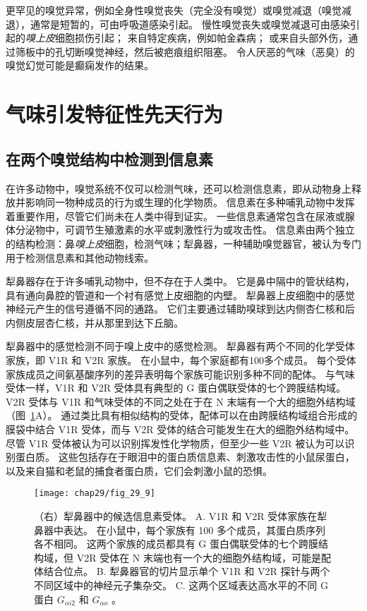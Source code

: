 更罕见的嗅觉异常，例如全身性嗅觉丧失（完全没有嗅觉）或嗅觉减退（嗅觉减退），通常是短暂的，可由呼吸道感染引起。
慢性嗅觉丧失或嗅觉减退可由感染引起的\textit{嗅上皮}细胞损伤引起；
来自特定疾病，例如帕金森病；
或来自头部外伤，通过筛板中的孔切断嗅觉神经，然后被疤痕组织阻塞。
令人厌恶的气味（恶臭）的嗅觉幻觉可能是癫痫发作的结果。



\section{气味引发特征性先天行为}

\subsection{在两个嗅觉结构中检测到信息素}

在许多动物中，嗅觉系统不仅可以检测气味，还可以检测信息素，即从动物身上释放并影响同一物种成员的行为或生理的化学物质。
信息素在多种哺乳动物中发挥着重要作用，尽管它们尚未在人类中得到证实。
一些信息素通常包含在尿液或腺体分泌物中，可调节生殖激素的水平或刺激性行为或攻击性。
信息素由两个独立的结构检测：鼻\textit{嗅上皮}细胞，检测气味；犁鼻器，一种辅助嗅觉器官，被认为专门用于检测信息素和其他动物线索。


犁鼻器存在于许多哺乳动物中，但不存在于人类中。
它是鼻中隔中的管状结构，具有通向鼻腔的管道和一个衬有感觉上皮细胞的内壁。
犁鼻器上皮细胞中的感觉神经元产生的信号遵循不同的通路。
它们主要通过辅助嗅球到达内侧杏仁核和后内侧皮层杏仁核，并从那里到达下丘脑。


犁鼻器中的感觉检测不同于嗅上皮中的感觉检测。
犁鼻器有两个不同的化学受体家族，即 V1R 和 V2R 家族。
在小鼠中，每个家庭都有100多个成员。
每个受体家族成员之间氨基酸序列的差异表明每个家族可能识别多种不同的配体。
与气味受体一样，V1R 和 V2R 受体具有典型的 G 蛋白偶联受体的七个跨膜结构域。 
V2R 受体与 V1R 和气味受体的不同之处在于在 N 末端有一个大的细胞外结构域（图~\ref{fig:29_9}A）。
通过类比具有相似结构的受体，配体可以在由跨膜结构域组合形成的膜袋中结合 V1R 受体，而与 V2R 受体的结合可能发生在大的细胞外结构域中。
尽管 V1R 受体被认为可以识别挥发性化学物质，但至少一些 V2R 被认为可以识别蛋白质。
这些包括存在于眼泪中的蛋白质信息素、刺激攻击性的小鼠尿蛋白，以及来自猫和老鼠的捕食者蛋白质，它们会刺激小鼠的恐惧。


\begin{figure}[htbp]
	\centering
	\texttt{[image: chap29/fig\_29\_9]}
	\caption{（右）犁鼻器中的候选信息素受体。
		A. V1R 和 V2R 受体家族在犁鼻器中表达。
		在小鼠中，每个家族有 100 多个成员，其蛋白质序列各不相同。
		这两个家族的成员都具有 G 蛋白偶联受体的七个跨膜结构域，但 V2R 受体在 N 末端也有一个大的细胞外结构域，可能是配体结合位点。
		B. 犁鼻器官的切片显示单个 V1R 和 V2R 探针与两个不同区域中的神经元子集杂交。
		C. 这两个区域表达高水平的不同 G 蛋白 $ G_{\alpha i 2} $ 和 $ G_{\alpha o}$ 。}
	\label{fig:29_9}
\end{figure}


